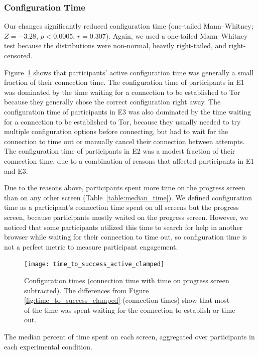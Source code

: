 \documentclass[USenglish,oneside,twocolumn]{article}
\begin{document}
\subsubsection{Configuration Time} 
Our changes significantly reduced configuration time (one-tailed Mann--Whitney; $Z = -3.28$, $p < 0.0005$, $r = 0.307$). Again, we used a one-tailed Mann--Whitney test because the distributions were non-normal, heavily right-tailed, and right-censored. 

Figure~\ref{fig:time_to_success_active_clamped} shows that participants' active configuration time was generally a small fraction of their connection time. The configuration time of participants in E1 was dominated by the time waiting for a connection to be established to Tor because they generally chose the correct configuration right away. The configuration time of participants in E3 was also dominated by the time waiting for a connection to be established to Tor, because they usually needed to try multiple configuration options before connecting, but had to wait for the connection to time out or manually cancel their connection between attempts. The configuration time of participants in E2 was a modest fraction of their connection time, due to a combination of reasons that affected participants in E1 and E3. 

Due to the reasons above, participants spent more time on the progress screen than on any other screen (Table~\ref{table:median_time}). We defined configuration time as a participant's connection time spent on all screens but the progress screen, because participants mostly waited on the progress screen. However, we noticed that some participants utilized this time to search for help in another browser while waiting for their connection to time out, so configuration time is not a perfect metric to measure participant engagement. 

\begin{figure}[t]
\centering
\texttt{[image: time\_to\_success\_active\_clamped]}
\caption{
Configuration times (connection time with time on progress screen subtracted).
The differences from Figure \ref{fig:time_to_success_clamped} (connection times) show that most of the time was spent waiting for the connection to establish or time out.
}
\label{fig:time_to_success_active_clamped}
\end{figure}

\begin{table}[t]
\centering

\caption{
The median percent of time spent on each screen, aggregated over participants in each experimental condition.}
\label{table:median_time}
\end{table}
\end{document}
